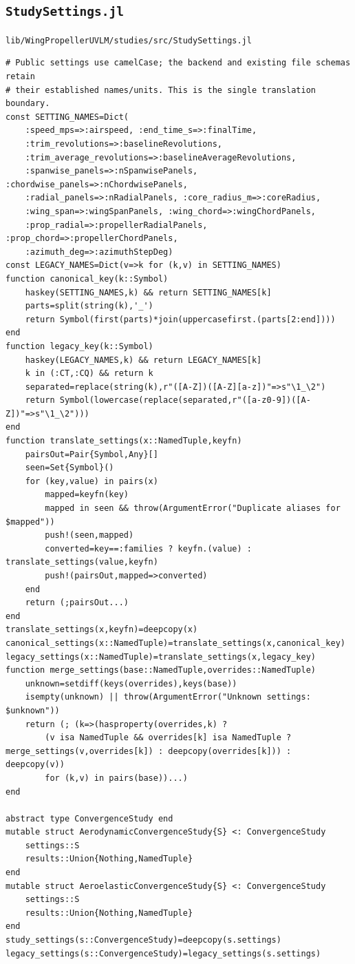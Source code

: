 \documentclass[11pt,a4paper]{article}
\newcommand{\code}{\nolinkurl}
\begin{document}
\subsection{\texorpdfstring{\code{StudySettings.jl}}{StudySettings.jl}}
\code{lib/WingPropellerUVLM/studies/src/StudySettings.jl}
\begin{lstlisting}
# Public settings use camelCase; the backend and existing file schemas retain
# their established names/units. This is the single translation boundary.
const SETTING_NAMES=Dict(
    :speed_mps=>:airspeed, :end_time_s=>:finalTime,
    :trim_revolutions=>:baselineRevolutions,
    :trim_average_revolutions=>:baselineAverageRevolutions,
    :spanwise_panels=>:nSpanwisePanels, :chordwise_panels=>:nChordwisePanels,
    :radial_panels=>:nRadialPanels, :core_radius_m=>:coreRadius,
    :wing_span=>:wingSpanPanels, :wing_chord=>:wingChordPanels,
    :prop_radial=>:propellerRadialPanels, :prop_chord=>:propellerChordPanels,
    :azimuth_deg=>:azimuthStepDeg)
const LEGACY_NAMES=Dict(v=>k for (k,v) in SETTING_NAMES)
function canonical_key(k::Symbol)
    haskey(SETTING_NAMES,k) && return SETTING_NAMES[k]
    parts=split(string(k),'_')
    return Symbol(first(parts)*join(uppercasefirst.(parts[2:end])))
end
function legacy_key(k::Symbol)
    haskey(LEGACY_NAMES,k) && return LEGACY_NAMES[k]
    k in (:CT,:CQ) && return k
    separated=replace(string(k),r"([A-Z])([A-Z][a-z])"=>s"\1_\2")
    return Symbol(lowercase(replace(separated,r"([a-z0-9])([A-Z])"=>s"\1_\2")))
end
function translate_settings(x::NamedTuple,keyfn)
    pairsOut=Pair{Symbol,Any}[]
    seen=Set{Symbol}()
    for (key,value) in pairs(x)
        mapped=keyfn(key)
        mapped in seen && throw(ArgumentError("Duplicate aliases for $mapped"))
        push!(seen,mapped)
        converted=key==:families ? keyfn.(value) : translate_settings(value,keyfn)
        push!(pairsOut,mapped=>converted)
    end
    return (;pairsOut...)
end
translate_settings(x,keyfn)=deepcopy(x)
canonical_settings(x::NamedTuple)=translate_settings(x,canonical_key)
legacy_settings(x::NamedTuple)=translate_settings(x,legacy_key)
function merge_settings(base::NamedTuple,overrides::NamedTuple)
    unknown=setdiff(keys(overrides),keys(base))
    isempty(unknown) || throw(ArgumentError("Unknown settings: $unknown"))
    return (; (k=>(hasproperty(overrides,k) ?
        (v isa NamedTuple && overrides[k] isa NamedTuple ? merge_settings(v,overrides[k]) : deepcopy(overrides[k])) : deepcopy(v))
        for (k,v) in pairs(base))...)
end

abstract type ConvergenceStudy end
mutable struct AerodynamicConvergenceStudy{S} <: ConvergenceStudy
    settings::S
    results::Union{Nothing,NamedTuple}
end
mutable struct AeroelasticConvergenceStudy{S} <: ConvergenceStudy
    settings::S
    results::Union{Nothing,NamedTuple}
end
study_settings(s::ConvergenceStudy)=deepcopy(s.settings)
legacy_settings(s::ConvergenceStudy)=legacy_settings(s.settings)


\end{lstlisting}
\end{document}

